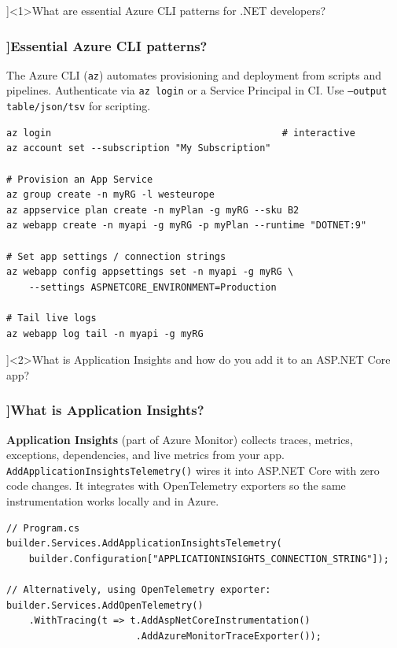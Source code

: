 \QuestionSlide[\CategoryBadge[AzureColor!20]{Azure}]<1>{What are essential Azure CLI patterns for .NET developers?}

\begin{frame}[fragile]
  \frametitle{\AnswerTitle[\CategoryBadge[AzureColor!20]{Azure}]{Essential Azure CLI patterns?}}

  {\footnotesize
  The Azure CLI (\texttt{az}) automates provisioning and deployment from scripts and pipelines. Authenticate via \texttt{az login} or a Service Principal in CI. Use \texttt{--output table/json/tsv} for scripting.
  }

  \begin{verbatim}
az login                                         # interactive
az account set --subscription "My Subscription"

# Provision an App Service
az group create -n myRG -l westeurope
az appservice plan create -n myPlan -g myRG --sku B2
az webapp create -n myapi -g myRG -p myPlan --runtime "DOTNET:9"

# Set app settings / connection strings
az webapp config appsettings set -n myapi -g myRG \
    --settings ASPNETCORE_ENVIRONMENT=Production

# Tail live logs
az webapp log tail -n myapi -g myRG
  \end{verbatim}
\end{frame}

\QuestionSlide[\CategoryBadge[AzureColor!20]{Azure}]<2>{What is Application Insights and how do you add it to an ASP.NET Core app?}

\begin{frame}[fragile]
  \frametitle{\AnswerTitle[\CategoryBadge[AzureColor!20]{Azure}]{What is Application Insights?}}

  {\footnotesize
  \textbf{Application Insights} (part of Azure Monitor) collects traces, metrics, exceptions, dependencies, and live metrics from your app. \texttt{AddApplicationInsightsTelemetry()} wires it into ASP.NET Core with zero code changes. It integrates with OpenTelemetry exporters so the same instrumentation works locally and in Azure.
  }

  \begin{verbatim}
// Program.cs
builder.Services.AddApplicationInsightsTelemetry(
    builder.Configuration["APPLICATIONINSIGHTS_CONNECTION_STRING"]);

// Alternatively, using OpenTelemetry exporter:
builder.Services.AddOpenTelemetry()
    .WithTracing(t => t.AddAspNetCoreInstrumentation()
                       .AddAzureMonitorTraceExporter());
  \end{verbatim}
\end{frame}
